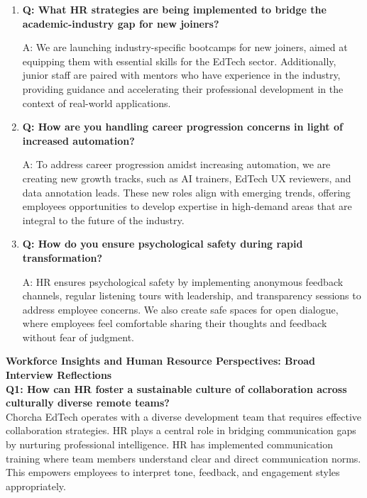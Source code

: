 \documentclass[12pt,a4paper,oneside]{book}
\begin{document}
\begin{enumerate}
A: To address emotional fatigue, we’ve introduced emotional resilience programs and rotate evaluators to reduce continuous exposure to stressful tasks. We also encourage regular micro-breaks to help prevent burnout. This approach ensures that evaluators maintain a healthy work-life balance while staying engaged and productive.

\item \textbf{Q: What HR strategies are being implemented to bridge the academic-industry gap for new joiners?} 

A: We are launching industry-specific bootcamps for new joiners, aimed at equipping them with essential skills for the EdTech sector. Additionally, junior staff are paired with mentors who have experience in the industry, providing guidance and accelerating their professional development in the context of real-world applications.

\item \textbf{Q: How are you handling career progression concerns in light of increased automation?} 

A: To address career progression amidst increasing automation, we are creating new growth tracks, such as AI trainers, EdTech UX reviewers, and data annotation leads. These new roles align with emerging trends, offering employees opportunities to develop expertise in high-demand areas that are integral to the future of the industry.

\item \textbf{Q: How do you ensure psychological safety during rapid transformation?} 

A: HR ensures psychological safety by implementing anonymous feedback channels, regular listening tours with leadership, and transparency sessions to address employee concerns. We also create safe spaces for open dialogue, where employees feel comfortable sharing their thoughts and feedback without fear of judgment.

\end{enumerate}

\textbf{Workforce Insights and Human Resource Perspectives: Broad Interview Reflections}\\

\textbf{Q1: How can HR foster a sustainable culture of collaboration across culturally diverse remote teams?} \\


Chorcha EdTech operates with a diverse development team that requires effective collaboration strategies. HR plays a central role in bridging communication gaps by nurturing professional intelligence. HR has implemented communication training where team members understand clear and direct communication norms. This empowers employees to interpret tone, feedback, and engagement styles appropriately.
\end{document}
